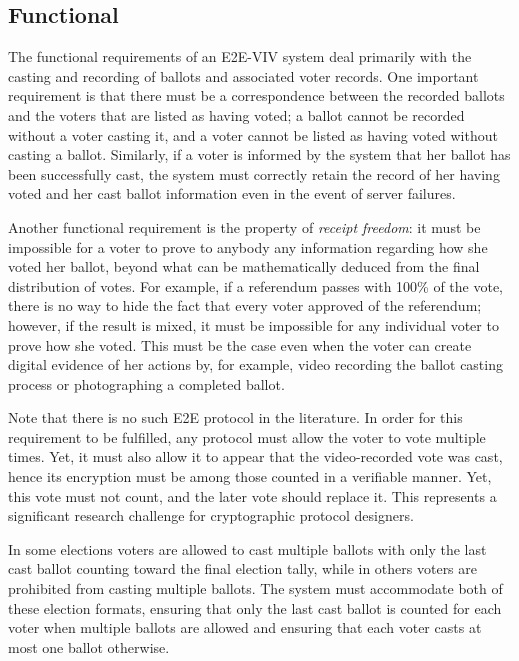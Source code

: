 \subsection{Functional} 
\label{sec:functional}

The functional requirements of an E2E-VIV system deal primarily with
the casting and recording of ballots and associated voter records. One
important requirement is that there must be a correspondence between
the recorded ballots and the voters that are listed as having voted; a
ballot cannot be recorded without a voter casting it, and a voter
cannot be listed as having voted without casting a ballot. Similarly,
if a voter is informed by the system that her ballot has been
successfully cast, the system must correctly retain the record of her
having voted and her cast ballot information even in the event of
server failures.

Another functional requirement is the property of \emph{receipt
  freedom}: it must be impossible for a voter to prove to anybody any
information regarding how she voted her ballot, beyond what can be
mathematically deduced from the final distribution of votes. For
example, if a referendum passes with 100\% of the vote, there is no
way to hide the fact that every voter approved of the referendum;
however, if the result is mixed, it must be impossible for any
individual voter to prove how she voted.  This must be the case even
when the voter can create digital evidence of her actions by, for
example, video recording the ballot casting process or photographing a
completed ballot.

Note that there is no such E2E protocol in the literature. In order
for this requirement to be fulfilled, any protocol must allow the
voter to vote multiple times.  Yet, it must also allow it to appear
that the video-recorded vote was cast, hence its encryption must be
among those counted in a verifiable manner. Yet, this vote must not
count, and the later vote should replace it. This represents a
significant research challenge for cryptographic protocol designers.

In some elections voters are allowed to cast multiple ballots with
only the last cast ballot counting toward the final election tally,
while in others voters are prohibited from casting multiple
ballots. The system must accommodate both of these election formats,
ensuring that only the last cast ballot is counted for each voter when
multiple ballots are allowed and ensuring that each voter casts at
most one ballot otherwise.

